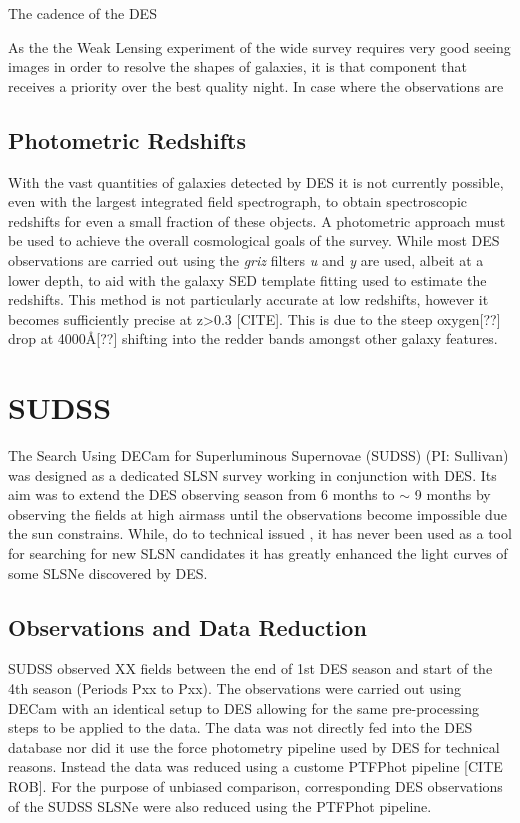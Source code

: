 The cadence of the DES 

As the the Weak Lensing experiment of the wide survey requires very good seeing images in order to resolve the shapes of galaxies, it is that component that receives a priority over the best quality night. In case where the observations are 

\subsection{Photometric Redshifts}
With the vast quantities of galaxies detected by DES it is not currently possible, even with the largest integrated field spectrograph, to obtain spectroscopic redshifts for even a small fraction of these objects. A photometric approach must be used to achieve the overall cosmological goals of the survey. While most DES observations are carried out using the \textit{griz} filters \textit{u} and \textit{y} are used, albeit at a lower depth, to aid with the galaxy SED template fitting used to estimate the redshifts. This method is not particularly accurate at low redshifts, however it becomes sufficiently precise at z>0.3 [CITE]. This is due to the steep oxygen[??] drop at 4000\AA [??] shifting into the redder bands amongst other galaxy features. 


\section{SUDSS}
The Search Using DECam for Superluminous Supernovae (SUDSS) (PI: Sullivan) was designed as a dedicated SLSN survey working in conjunction with DES. Its aim was to extend the DES observing season from 6 months to $\sim$ 9 months by observing the fields at high airmass until the observations become impossible due the sun constrains. While, do to technical issued , it has never been used as a tool for searching for new SLSN candidates it has greatly enhanced the light curves of some SLSNe discovered by DES. 

\subsection{Observations and Data Reduction}
SUDSS observed XX fields between the end of 1st DES season and start of the 4th season (Periods Pxx to Pxx). The observations were carried out using DECam with an identical setup to DES allowing for the same pre-processing steps to be applied to the data. The data was not directly fed into the DES database nor did it use the force photometry pipeline used by DES for technical reasons. Instead the data was reduced using a custome PTFPhot pipeline [CITE ROB]. For the purpose of unbiased comparison, corresponding DES observations of the SUDSS SLSNe were also reduced using the PTFPhot pipeline.

